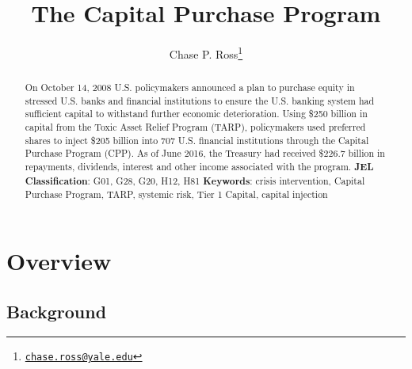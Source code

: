 \documentclass[12pt]{article}
\begin{document}
	\lhead{}
	\rhead{}
	\renewcommand{\headrulewidth}{0.0pt}
	\renewcommand{\footrulewidth}{0.0pt}

\title{The Capital Purchase Program}
\author{Chase P. Ross\thanks{\texttt{\href{mailto:chase.ross@yale.edu}{chase.ross@yale.edu}}}}
\date{}


\maketitle

\begin{abstract}
On October 14, 2008 U.S. policymakers announced a plan to purchase equity in stressed U.S. banks and financial institutions to ensure the U.S. banking system had sufficient capital to withstand further economic deterioration. Using \$250 billion in capital from the Toxic Asset Relief Program (TARP), policymakers used preferred shares to inject \$205 billion into 707 U.S. financial institutions through the Capital Purchase Program (CPP). As of June 2016, the Treasury had received \$226.7 billion in repayments, dividends, interest and other income associated with the program.
\newline
\newline
\textbf{JEL Classification}: G01, G28, G20, H12, H81
\newline
\newline
\textbf{Keywords}: crisis intervention, Capital Purchase Program, TARP, systemic risk, Tier 1 Capital, capital injection

\end{abstract}
\newpage
\tableofcontents
\newpage
\linenumbers
\section{Overview}

\subsection{Background}
\end{document}
